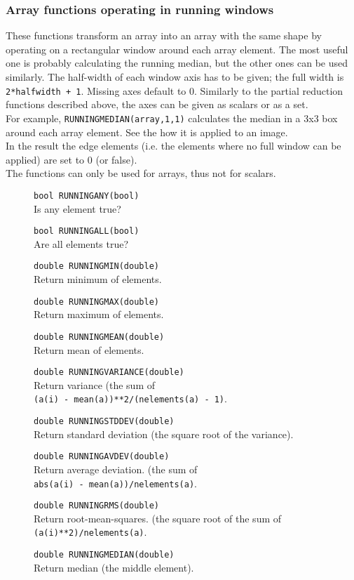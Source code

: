 \subsubsection{Array functions operating in running windows}
These functions transform an array into an array with the same shape
by operating on a rectangular window around each array element.
The most useful one is probably calculating the running median, but
the other ones can be used similarly.
The half-width of each window axis has to be given; the full width is
\texttt{2*halfwidth + 1}. Missing axes default to 0.
Similarly to the partial reduction functions described above, the axes
can be given as scalars or as a set.
\\For example,
\texttt{RUNNINGMEDIAN(array,1,1)} calculates the median
in a 3x3 box around each array element.
See the  how it is applied to an image.
\\In the result the edge elements (i.e. the elements where no full
window can be applied) are set to 0 (or false).
\\The functions can only be used for arrays, thus not for scalars.
\begin{description}
  \item[] \texttt{bool RUNNINGANY(bool)}\\
    Is any element true?
  \item[] \texttt{bool RUNNINGALL(bool)}\\
    Are all elements true?
  \item[] \texttt{double RUNNINGMIN(double)}\\
    Return minimum of elements.
  \item[] \texttt{double RUNNINGMAX(double)}\\
    Return maximum of elements.
  \item[] \texttt{double RUNNINGMEAN(double)}\\
    Return mean of elements.
  \item[] \texttt{double RUNNINGVARIANCE(double)}\\
    Return variance (the sum of
    \\\texttt{(a(i) - mean(a))**2/(nelements(a) - 1)}.
  \item[] \texttt{double RUNNINGSTDDEV(double)}\\
    Return standard deviation (the square root of the variance).
  \item[] \texttt{double RUNNINGAVDEV(double)}\\
    Return average deviation. (the sum of 
    \\\texttt{abs(a(i) - mean(a))/nelements(a)}.
  \item[] \texttt{double RUNNINGRMS(double)}\\
    Return root-mean-squares. (the square root of the sum of
    \\\texttt{(a(i)**2)/nelements(a)}.
  \item[] \texttt{double RUNNINGMEDIAN(double)}\\
    Return median (the middle element).
\end{description}

